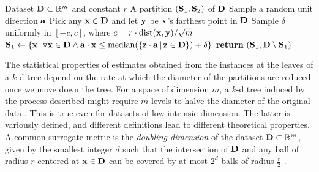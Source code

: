\begin{algorithm}[t]
  \caption{}\label{alg:splitmax}
  \begin{algorithmic}[1]
    \Require Dataset $\mathbf{D} \subset \mathbb{R}^m$ and constant $r$
    \Ensure A partition $(\mathbf{S}_1,\mathbf{S}_2)$ of $\mathbf{D}$
    \State Sample a random unit direction $\mathbf{a}$
    \State Pick any $\mathbf{x}\in\mathbf{D}$ and let $\mathbf{y}$ be $\mathbf{x}$'s farthest point in $\mathbf{D}$
    \State Sample $\delta$ uniformly in $[-c,c]$, where ${c=r\cdot\operatorname{dist}(\mathbf{x},\mathbf{y})/\sqrt{m}}$
    \State $\mathbf{S}_1\gets\{\mathbf{x}\,|\,\forall\mathbf{x}\in\mathbf{D}\wedge\mathbf{a}\cdot\mathbf{x}\leq\operatorname{median}(\{\mathbf{z}\cdot\mathbf{a}\,|\,\mathbf{z}\in\mathbf{D}\})+\delta\}$
    \State \textbf{return} $(\mathbf{S}_1,\mathbf{D}\setminus\mathbf{S}_1)$
  \end{algorithmic}
\end{algorithm}

The statistical properties of estimates obtained from the instances at the leaves of a $k$-d tree
depend on the rate at which the diameter of the partitions are reduced once we move down the tree.
For a space of dimension $m$, a $k$-d tree induced by the process described might require $m$
levels to halve the diameter of the original data \citep{dasgupta08b}. This is true even for
datasets of low intrinsic dimension. The latter is variously defined, and different definitions
lead to different theoretical properties. A common surrogate metric is the \emph{doubling
dimension} of the dataset $\mathbf{D}\subset\mathbb{R}^m$, given by the smallest integer $d$ such that
the intersection of $\mathbf{D}$ and any ball of radius $r$ centered at $\mathbf{x}\in\mathbf{D}$ can be
covered by at most $2^d$ balls of radius $\frac{r}{2}$ \citep{dhesi10}.

